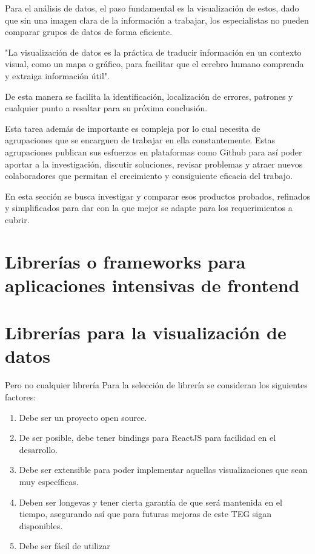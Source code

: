 Para el análisis de datos, el paso fundamental es la visualización de estos, dado que sin una imagen clara de la información a trabajar, los especialistas no pueden comparar grupos de datos de forma eficiente. 

"La visualización de datos es la práctica de traducir información en un contexto visual, como un mapa o gráfico, para facilitar que el cerebro humano comprenda y extraiga información útil". \cite{DefinitionDataViz}

De esta manera se facilita la identificación, localización de errores, patrones y cualquier punto a resaltar para su próxima conclusión.

Esta tarea además de importante es compleja por lo cual necesita de agrupaciones que se encarguen de trabajar en ella constantemente. Estas agrupaciones publican sus esfuerzos en plataformas como Github para así poder aportar a la investigación, discutir soluciones, revisar problemas y atraer nuevos colaboradores que permitan el crecimiento y consiguiente eficacia del trabajo.

En esta sección se busca investigar y comparar esos productos probados, refinados y simplificados para dar con la que mejor se adapte para los requerimientos a cubrir. 

\section{Librerías o frameworks para aplicaciones intensivas de frontend}


\section{Librerías para la visualización de datos}
Pero no cualquier librería 
Para la selección de librería se consideran los siguientes factores:

\begin{enumerate}
    \item {Debe ser un proyecto open source.}
    \item {De ser posible, debe tener bindings para ReactJS para facilidad en el desarrollo.}
    \item {Debe ser extensible para poder implementar aquellas visualizaciones que sean muy específicas.}
    \item {Deben ser longevas y tener cierta garantía de que será mantenida en el tiempo,
    asegurando así que para futuras mejoras de este TEG sigan disponibles.}
    \item {Debe ser fácil de utilizar}
\end{enumerate}

